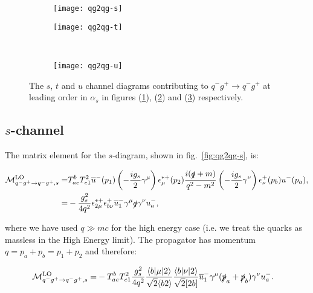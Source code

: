		\begin{figure}[h]
			\centering
			\begin{subfigure}[b]{0.3\textwidth}
				\texttt{[image: qg2qg-s]}
				\caption{}
				\label{fig:qg2qg-s}
			\end{subfigure}

			\begin{subfigure}[b]{0.3\textwidth}
				\texttt{[image: qg2qg-t]}
				\caption{}
				\label{fig:qg2qg-t}
			\end{subfigure}
			~
			\begin{subfigure}[b]{0.3\textwidth}
				\texttt{[image: qg2qg-u]}
				\caption{}
				\label{fig:qg2qg-u}
			\end{subfigure}
			\caption{The $s$, $t$ and $u$ channel diagrams contributing to $q^-g^+\to q^-g^+$ at leading
			         order in $\alpha_s$ in figures (\ref{fig:qg2qg-s}), (\ref{fig:qg2qg-t}) and (\ref{fig:qg2qg-u})
			         respectively.}
			\label{fig:TwoToTwo2}
		\end{figure}

		\subsection{$s$-channel}

			The matrix element for the $s$-diagram, shown in fig.~\eqref{fig:qg2qg-s}, is:

			\begin{align}
				\mathcal{M}_{q^-g^+\to q^-g^+, s}^{\text{LO}}=&T^b_{ae}T^2_{e1}\overline{u}^-(p_1)\left(-\frac{ig_s}{2}\gamma^\mu\right)\epsilon_\mu^{*+}(p_2)
					\frac{i(\slashed q+m)}{q^2-m^2}\left(-\frac{ig_s}{2}\gamma^\nu\right)\epsilon^+_\nu(p_b)u^-(p_a), \\
				=&-\frac{g^2_s}{4q^2}\epsilon^{*+}_{2\mu}\epsilon^+_{b\nu}\overline{u}^-_1\gamma^\mu\slashed q\gamma^\nu u^-_a,
			\end{align}

			where we have used $q\gg mc$ for the high energy case (i.e. we treat the quarks as massless in the High Energy limit).
			The propagator has momentum $q=p_a+p_b=p_1+p_2$ and therefore:

			\begin{align}
				\mathcal{M}_{q^-g^+\to q^-g^+, s}^{\text{LO}}=&-T^b_{ae}T^2_{e1}\frac{g^2_s}{4q^2}\frac{\langle{b}|\mu|2\rangle}{\sqrt{2}\langle{b2\rangle}}
				\frac{\langle{b}|\nu|2\rangle}{\sqrt{2}[2b]}\overline{u}^-_1\gamma^\mu(\slashed{p}_a+\slashed{p}_b)\gamma^\nu u^-_a.
			\end{align}

